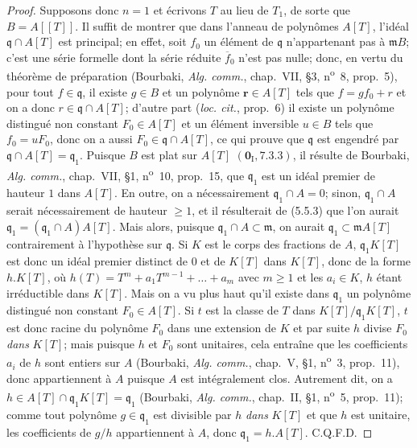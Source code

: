 \begin{proof}
Supposons donc $n=1$ et écrivons $T$ au lieu de $T_1$, de sorte que $B=A[[T]]$. Il
suffit de montrer que dans l'anneau de polynômes $A[T]$, l'idéal
$\mathfrak q\cap A[T]$ est principal;
en effet, soit $f_0$ un élément de $\mathfrak q$ n'appartenant pas à $\mathfrak mB$;
c'est une série formelle dont la série réduite $\overline f_0$ n'est pas nulle; donc,
en vertu du théorème de préparation (Bourbaki, \emph{Alg. comm.}, chap.~VII, \S3,
n\textsuperscript{o}~8, prop.~5), pour tout $f\in\mathfrak q$, il existe $g\in B$ et
un polynôme $\boldsymbol{r}\in A[T]$ tels que $f=gf_0+r$ et on a donc
$r\in\mathfrak q\cap A[T]$; d'autre part (\emph{loc. cit.}, prop.~6) il existe un
polynôme distingué non constant $F_0\in A[T]$ et un élément inversible $u\in B$ tels
que $f_0=uF_0$, donc on a aussi $F_0\in\mathfrak q\cap A[T]$, ce qui prouve que
$\mathfrak q$ est engendré par $\mathfrak q\cap A[T]=\mathfrak q_1$. Puisque $B$
est plat sur $A[T]$ $(\mathbf 0_{\mathrm I}, 7.3.3)$, il résulte de Bourbaki,
\emph{Alg. comm.}, chap.~VII, \S1, n\textsuperscript{o}~10, prop.~15, que
$\mathfrak q_1$ est un idéal premier de hauteur $1$ dans $A[T]$.
En outre, on a nécessairement $\mathfrak q_1\cap A=0$; sinon,
$\mathfrak q_1\cap A$ serait nécessairement de hauteur $\geq1$, et il résulterait de
(5.5.3) que l'on aurait $\mathfrak q_1=(\mathfrak q_1\cap A)A[T]$. Mais alors,
puisque $\mathfrak q_1\cap A\subset\mathfrak m$, on aurait
$\mathfrak q_1\subset\mathfrak mA[T]$ contrairement à l'hypothèse sur
$\mathfrak q$. Si $K$ est le corps des fractions de $A$, $\mathfrak q_1K[T]$ est
donc un idéal premier distinct de $0$ et de $K[T]$ dans $K[T]$, donc de la forme
$h.K[T]$, où $h(T)=T^m+a_1T^{m-1}+\ldots+a_m$ avec $m\geq1$
et les $a_i\in K$, $h$ étant irréductible dans $K[T]$. Mais on a vu plus haut qu'il
existe dans $\mathfrak q_1$ un polynôme distingué non constant $F_0\in A[T]$. Si $t$
est la classe de $T$ dans $K[T]/\mathfrak q_1K[T]$, $t$ est donc racine du polynôme
$F_0$ dans une extension de $K$ et par suite $h$ divise $F_0$ \emph{dans} $K[T]$; mais
puisque $h$ et $F_0$ sont unitaires, cela entraîne que les coefficients $a_i$ de $h$
sont entiers sur $A$ (Bourbaki, \emph{Alg. comm.}, chap.~V, \S1,
n\textsuperscript{o}~3, prop.~11), donc appartiennent à $A$ puisque $A$ est
intégralement clos. Autrement dit, on a $h\in A[T]\cap\mathfrak q_1K[T]=\mathfrak q_1$
(Bourbaki, \emph{Alg. comm.}, chap.~II, \S1, n\textsuperscript{o}~5, prop.~11);
comme tout polynôme $g\in\mathfrak q_1$ est divisible par $h$ \emph{dans} $K[T]$ et que $h$
est unitaire, les coefficients de $g/h$ appartiennent à $A$, donc
$\mathfrak q_1=h.A[T]$. C.Q.F.D.
\end{proof}

